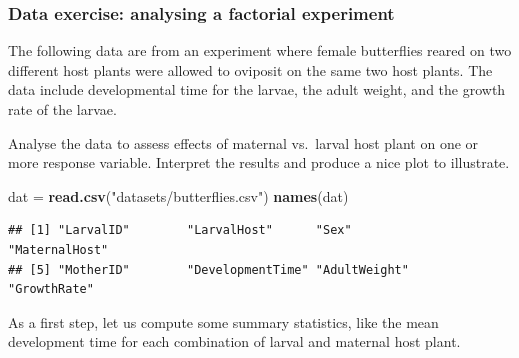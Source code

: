 \documentclass[
]{article}
\newenvironment{Shaded}{\begin{snugshade}}{\end{snugshade}}
\newcommand{\FunctionTok}[1]{\textcolor[rgb]{0.13,0.29,0.53}{\textbf{#1}}}
\newcommand{\NormalTok}[1]{#1}
\newcommand{\OtherTok}[1]{\textcolor[rgb]{0.56,0.35,0.01}{#1}}
\newcommand{\SpecialCharTok}[1]{\textcolor[rgb]{0.81,0.36,0.00}{\textbf{#1}}}
\newcommand{\StringTok}[1]{\textcolor[rgb]{0.31,0.60,0.02}{#1}}
\begin{document}
\subsubsection{Data exercise: analysing a factorial
experiment}\label{data-exercise-analysing-a-factorial-experiment}

The following data are from an experiment where female butterflies
reared on two different host plants were allowed to oviposit on the same
two host plants. The data include developmental time for the larvae, the
adult weight, and the growth rate of the larvae.

Analyse the data to assess effects of maternal vs.~larval host plant on
one or more response variable. Interpret the results and produce a nice
plot to illustrate.

\begin{Shaded}
\begin{Highlighting}[]
\NormalTok{dat }\OtherTok{=} \FunctionTok{read.csv}\NormalTok{(}\StringTok{"datasets/butterflies.csv"}\NormalTok{)}
\FunctionTok{names}\NormalTok{(dat)}
\end{Highlighting}
\end{Shaded}

\begin{verbatim}
## [1] "LarvalID"        "LarvalHost"      "Sex"             "MaternalHost"   
## [5] "MotherID"        "DevelopmentTime" "AdultWeight"     "GrowthRate"
\end{verbatim}

As a first step, let us compute some summary statistics, like the mean
development time for each combination of larval and maternal host plant.

\begin{Shaded}
\end{Shaded}
\end{document}
